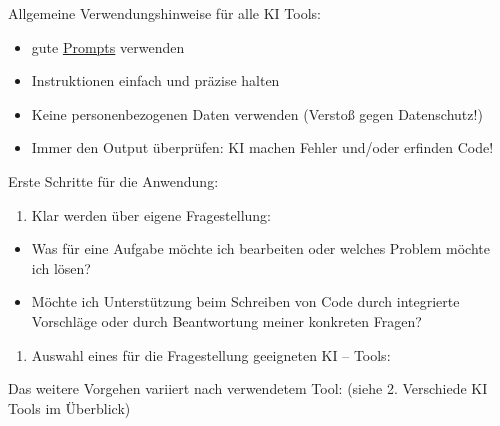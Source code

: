 \documentclass[
  letterpaper,
  DIV=11]{scrreprt}
\providecommand{\tightlist}{%
  \setlength{\itemsep}{0pt}\setlength{\parskip}{0pt}}\usepackage{longtable,booktabs,array}
\begin{document}
\begin{tcolorbox}[enhanced jigsaw, rightrule=.15mm, colframe=quarto-callout-important-color-frame, opacityback=0, toptitle=1mm, colbacktitle=quarto-callout-important-color!10!white, breakable, titlerule=0mm, colback=white, arc=.35mm, toprule=.15mm, leftrule=.75mm, bottomtitle=1mm, coltitle=black, left=2mm, title=\textcolor{quarto-callout-important-color}{\faExclamation}\hspace{0.5em}{Wichtig}, bottomrule=.15mm, opacitybacktitle=0.6]

Allgemeine Verwendungshinweise für alle KI Tools:

\begin{itemize}
\item
  gute
  \href{https://www.intern.fau.de/informationstechnik-it/it-tipps-aus-dem-cio-office/prompting-lernen/}{Prompts}
  verwenden
\item
  Instruktionen einfach und präzise halten
\item
  Keine personenbezogenen Daten verwenden (Verstoß gegen Datenschutz!)
\item
  Immer den Output überprüfen: KI machen Fehler und/oder erfinden Code!
\end{itemize}

\end{tcolorbox}

Erste Schritte für die Anwendung:

\begin{enumerate}
\def\labelenumi{\arabic{enumi}.}
\tightlist
\item
  Klar werden über eigene Fragestellung:
\end{enumerate}

\begin{itemize}
\tightlist
\item
  Was für eine Aufgabe möchte ich bearbeiten oder welches Problem möchte
  ich lösen?
\item
  Möchte ich Unterstützung beim Schreiben von Code durch integrierte
  Vorschläge oder durch Beantwortung meiner konkreten Fragen?
\end{itemize}

\begin{enumerate}
\def\labelenumi{\arabic{enumi}.}
\setcounter{enumi}{1}
\tightlist
\item
  Auswahl eines für die Fragestellung geeigneten KI -- Tools:
\end{enumerate}

Das weitere Vorgehen variiert nach verwendetem Tool: (siehe 2.
Verschiede KI Tools im Überblick)
\end{document}
